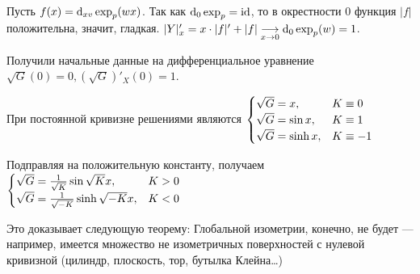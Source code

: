 \documentclass[a4paper]{report}
\begin{document}
    Пусть $f(x) = \operatorname{d}\!_{xv}\exp_p(wx)$.
    Так как $\operatorname{d}\!_0 \exp_p = \operatorname{id}$, то в окрестности $0$ функция $|f|$ положительна, значит, гладкая.
    $|Y|'_{x} = x \cdot |f|' + |f| \underset{x \to 0}{\longrightarrow} \operatorname{d}\!_0\exp_p(w) = 1$.

    Получили начальные данные на дифференциальное уравнение $\sqrt{G}(0) = 0, (\sqrt{G})'_X(0) = 1$.

    При постоянной кривизне решениями являются $\begin{cases}\sqrt{G} = x, & K \equiv 0 \\ \sqrt{G} = \sin x, & K \equiv 1 \\ \sqrt{G} = \sinh x, & K \equiv -1\end{cases}$

    Подправляя на положительную константу, получаем $\begin{cases}\sqrt{G} = \frac{1}{\sqrt{K}}\sin\sqrt{K} x, & K > 0  \\ \sqrt{G} = \frac{1}{\sqrt{-K}}\sinh \sqrt{-K}x, & K < 0\end{cases}$

    Это доказывает следующую теорему:
    Глобальной изометрии, конечно, не будет --- например, имеется множество не изометричных поверхностей с нулевой кривизной (цилиндр, плоскость, тор, бутылка Клейна\dots)
\end{document}
